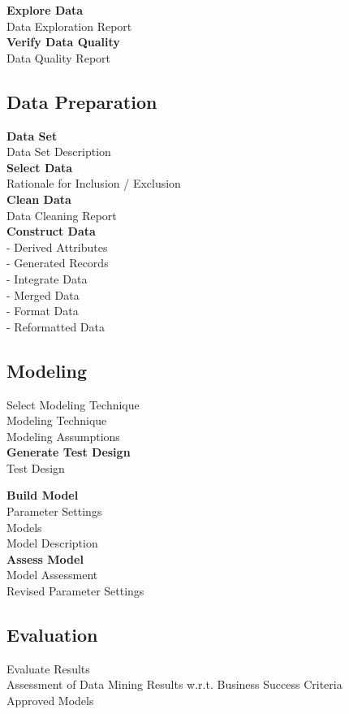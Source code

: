 \documentclass[12pt,a4paper,titlepage]{report}\usepackage{graphicx, color}
\begin{document}
\textbf{Explore Data} \\
Data Exploration Report \\

\textbf{Verify Data Quality} \\
Data Quality Report \\

\subsection{Data Preparation} 
\textbf{Data Set} \\
Data Set Description \\

\textbf{Select Data} \\ 
Rationale for Inclusion / Exclusion\\

\textbf{Clean Data} \\ 
Data Cleaning Report \\

\textbf{Construct Data} \\
- Derived Attributes \\ 
- Generated Records \\
- Integrate Data \\
- Merged Data \\
- Format Data \\
- Reformatted Data \\

\subsection{Modeling }
Select Modeling Technique \\
Modeling Technique \\
Modeling Assumptions \\

\textbf{Generate Test Design} \\
Test Design

\textbf{Build Model} \\
Parameter Settings \\
Models \\
Model Description \\

\textbf{Assess Model} \\
Model Assessment \\
Revised Parameter Settings
  
\subsection{Evaluation }
Evaluate Results \\
Assessment of Data Mining Results w.r.t. Business Success Criteria \\
Approved Models \\
\end{document}
